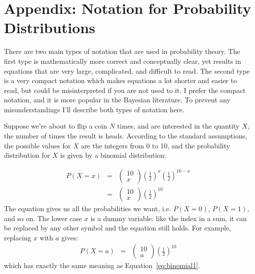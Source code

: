 \section{Appendix: Notation for Probability Distributions}
There are two main types of notation that are used in probability theory. The
first type is mathematically more correct and conceptually
clear, yet results in equations that are very large, complicated,
and difficult to read.
The second type is a very compact notation which makes equations a lot
shorter and easier to read, but could be misinterpreted if you are not used to
it. I prefer the compact notation, and it is more popular in the Bayesian
literature. To prevent any misunderstandings I'll describe both types of
notation here.

Suppose we're about to flip a coin $N$ times, and are interested in the
quantity $X$, the number of times the result is heads. According
to the standard assumptions, the possible values for $X$ are the integers from 0
to 10, and the probability distribution for $X$ is given by
a binomial distribution:

\begin{eqnarray}
P(X = x) &=& \left(\begin{array}{cc}10\\ x\end{array}\right)
\left(\frac{1}{2}\right)^x\left(\frac{1}{2}\right)^{10 - x}\nonumber\\
&=& \left(\begin{array}{cc}10\\ x\end{array}\right)
\left(\frac{1}{2}\right)^{10}\label{eq:binomial1}
\end{eqnarray}
The equation gives us all the probabilities we want, i.e. $P(X=0)$, $P(X=1)$,
and so on. The lower case $x$ is a dummy variable: like the index in a sum, it
can be replaced by any other symbol and the equation still holds. For example,
replacing $x$ with $a$ gives:
\begin{eqnarray}
P(X = a) &=& \left(\begin{array}{cc}10\\ a\end{array}\right)
\left(\frac{1}{2}\right)^{10}\label{eq:binomial2}
\end{eqnarray}
which has exactly the same meaning as Equation~\ref{eq:binomial1}.


